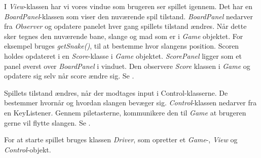 I \textit{View}-klassen har vi vores vindue som brugeren ser spillet igennem. Det har en \textit{BoardPanel}-klassen som viser den nuværende spil tilstand. \textit{BoardPanel} nedarver fra \textit{Observer} og opdatere panelet hver gang spillets tilstand ændres. Når dette sker tegnes den nuværende bane, slange og mad som er i \textit{Game} objektet. For eksempel bruges \textit{getSnake()}, til at bestemme hvor slangens position. Scoren holdes opdateret i en \textit{Score}-klasse i \textit{Game} objektet. \textit{ScorePanel} ligger som et panel øverst over \textit{BoardPanel} i vinduet. Den observere \textit{Score} klassen i \textit{Game} og opdatere sig selv når score ændre sig. Se .

Spillets tilstand ændres, når der modtages input i Control-klasserne. De bestemmer hvornår og hvordan slangen bevæger sig. \textit{Control}-klassen nedarver fra en KeyListener. Gennem piletasterne, kommunikere den til \textit{Game} at brugeren gerne vil flytte slangen. Se .

For at starte spillet bruges klassen \textit{Driver}, som opretter et \textit{Game}-, \textit{View} og \textit{Control}-objekt.